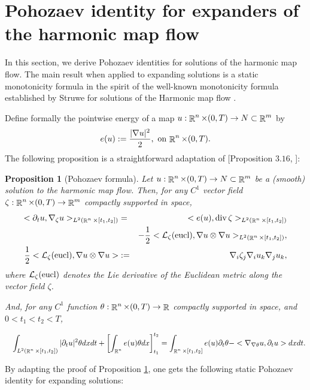 \documentclass[a4paper,11pt,reqno]{amsart}
\newtheorem{prop}[defn]{Proposition}
\def\eucl{\mathop{\rm eucl}\nolimits}
\def\div{\mathop{\rm div}\nolimits}
\def\eucl{\mathop{\rm eucl}\nolimits}
\def\div{\mathop{\rm div}\nolimits}
\def\R{\mathop{\rm \mathbb{R}}\nolimits}
\begin{document}
\section{Pohozaev identity for expanders of the harmonic map flow}\label{section-pohozaev-identity}
In this section, we derive Pohozaev identities for solutions of the harmonic map flow. The main result when applied to expanding solutions is a static monotonicity formula in the spirit of the well-known monotonicity formula established by Struwe for solutions of the Harmonic map flow \cite{Str-Har-Map}.

Define formally the pointwise energy of a map $u:\R^n\times(0,T)\rightarrow N\subset\R^m$ by $$e(u):=\frac{|\nabla u|^2}{2},\text{ on $\R^n\times (0,T)$}.$$
The following proposition is a straightforward adaptation of [Proposition $3.16$, \cite{Der-Lam-HMF}]:
\begin{prop}[Pohozaev formula]\label{Poho-for-gal-sol}
Let $u:\R^n\times(0,T)\rightarrow N\subset\R^m$ be a (smooth) solution to the harmonic map flow. Then, for any $C^1$ vector field $\zeta:\R^n\times(0,T)\rightarrow \R^m$ compactly supported in space,
\begin{eqnarray*}
<\partial_tu,\nabla_{\zeta}u>_{L^2(\R^n\times[t_1,t_2])}&=&<e(u),\div\zeta>_{L^2(\R^n\times[t_1,t_2])}\\
&&-\frac{1}{2}<\mathcal{L}_{\zeta}(\eucl),\nabla u\otimes\nabla u>_{L^2(\R^n\times[t_1,t_2])},\\
\frac{1}{2}<\mathcal{L}_{\zeta}(\eucl),\nabla u\otimes\nabla u>&:=&\nabla_i\zeta_j\nabla_iu_k\nabla_ju_k,
\end{eqnarray*}
where $\mathcal{L}_{\zeta}(\eucl)$ denotes the Lie derivative of the Euclidean metric along the vector field $\zeta$.

And, for any $C^1$ function $\theta:\R^n\times(0,T)\rightarrow \R$ compactly supported in space, and $0<t_1<t_2<T$,

\begin{eqnarray*}
&&\int_{L^2(\R^n\times[t_1,t_2])}|\partial_tu|^2\theta dxdt+\left[\int_{\R^n}e(u)\theta dx\right]_{t_1}^{t_2}=\int_{\R^n\times[t_1,t_2]}e(u)\partial_t\theta-<\nabla_{\nabla \theta}u,\partial_tu> dxdt.
\end{eqnarray*}


\end{prop}
By adapting the proof of Proposition \ref{Poho-for-gal-sol}, one gets the following static Pohozaev identity for expanding solutions:
\end{document}
